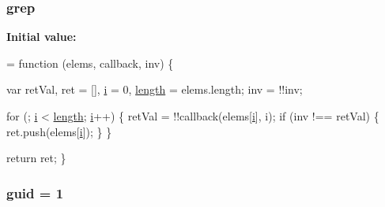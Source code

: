 \subsubsection[{\texorpdfstring{grep}{grep}}]{ grep}\hypertarget{jquery-2_82_81-vsdoc_8js_ae68047c53cf0b4906eb8f3256d860435}{}\label{jquery-2_82_81-vsdoc_8js_ae68047c53cf0b4906eb8f3256d860435}
{\bfseries Initial value\+:}
\begin{DoxyCode}
= \textcolor{keyword}{function} (elems, callback, inv) \{
        

        var retVal,
            ret = [],
            \hyperlink{geolocation-marker_8js_a0325b7ce0988782a8032e720ef3aa411}{i} = 0,
            \hyperlink{jquery-2_82_81-vsdoc_8js_aa7de35d58da66d9944ab9cbe82c19640}{length} = elems.length;
        inv = !!inv;

        
        
        \textcolor{keywordflow}{for} (; \hyperlink{geolocation-marker_8js_a0325b7ce0988782a8032e720ef3aa411}{i} < \hyperlink{jquery-2_82_81-vsdoc_8js_aa7de35d58da66d9944ab9cbe82c19640}{length}; \hyperlink{geolocation-marker_8js_a0325b7ce0988782a8032e720ef3aa411}{i}++) \{
            retVal = !!callback(elems[\hyperlink{geolocation-marker_8js_a0325b7ce0988782a8032e720ef3aa411}{i}], i);
            \textcolor{keywordflow}{if} (inv !== retVal) \{
                ret.push(elems[\hyperlink{geolocation-marker_8js_a0325b7ce0988782a8032e720ef3aa411}{i}]);
            \}
        \}

        \textcolor{keywordflow}{return} ret;
    \}
\end{DoxyCode}
\subsubsection[{\texorpdfstring{guid}{guid}}]{ guid = 1}\hypertarget{jquery-2_82_81-vsdoc_8js_a15bc7663c428889bacadc7aec13400cc}{}\label{jquery-2_82_81-vsdoc_8js_a15bc7663c428889bacadc7aec13400cc}
